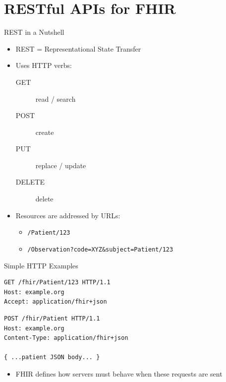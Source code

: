 \documentclass[aspectratio=1610]{beamer}
\begin{document}
	\section{RESTful APIs for FHIR}
	
	\begin{frame}{REST in a Nutshell}
		\begin{itemize}
			\item REST = Representational State Transfer
			\item Uses HTTP verbs:
			\begin{description}
				\item[GET] read / search
				\item[POST] create
				\item[PUT] replace / update
				\item[DELETE] delete
			\end{description}
			\item Resources are addressed by URLs:
			\begin{itemize}
				\item \texttt{/Patient/123}
				\item \texttt{/Observation?code=XYZ\&subject=Patient/123}
			\end{itemize}
		\end{itemize}
	\end{frame}
	
	\begin{frame}[fragile]{Simple HTTP Examples}
		\lstset{language=HTTP}
		\begin{lstlisting}
GET /fhir/Patient/123 HTTP/1.1
Host: example.org
Accept: application/fhir+json
		\end{lstlisting}
		
		\begin{lstlisting}
POST /fhir/Patient HTTP/1.1
Host: example.org
Content-Type: application/fhir+json
			
{ ...patient JSON body... }
		\end{lstlisting}
		\begin{itemize}
			\item FHIR defines how servers must behave when these requests are sent
		\end{itemize}
	\end{frame}
	
\end{document}
